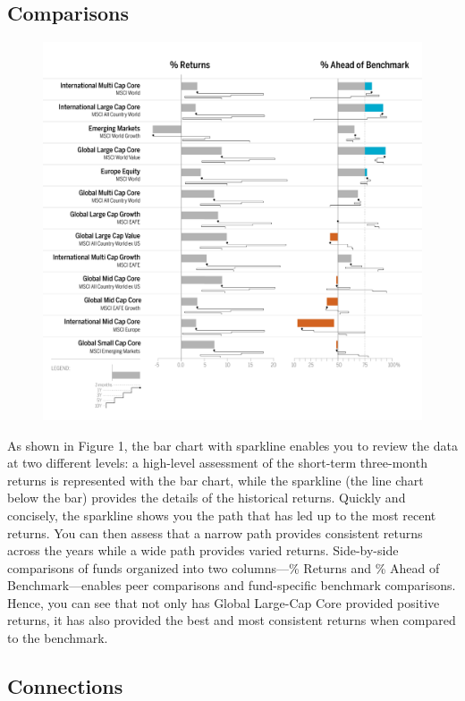 \documentclass[]{book}
\theoremstyle{definition}
\theoremstyle{definition}
\theoremstyle{definition}
\theoremstyle{remark}
\begin{document}
\subsection{Comparisons}\label{comparisons}

\begin{figure}
\centering
\includegraphics{images/patten-1.jpg}
\caption{}
\end{figure}

As shown in Figure 1, the bar chart with sparkline enables you to review
the data at two different levels: a high-level assessment of the
short-term three-month returns is represented with the bar chart, while
the sparkline (the line chart below the bar) provides the details of the
historical returns. Quickly and concisely, the sparkline shows you the
path that has led up to the most recent returns. You can then assess
that a narrow path provides consistent returns across the years while a
wide path provides varied returns. Side-by-side comparisons of funds
organized into two columns---\% Returns and \% Ahead of
Benchmark---enables peer comparisons and fund-specific benchmark
comparisons. Hence, you can see that not only has Global Large-Cap Core
provided positive returns, it has also provided the best and most
consistent returns when compared to the benchmark.

\subsection{Connections}\label{connections}
\end{document}
